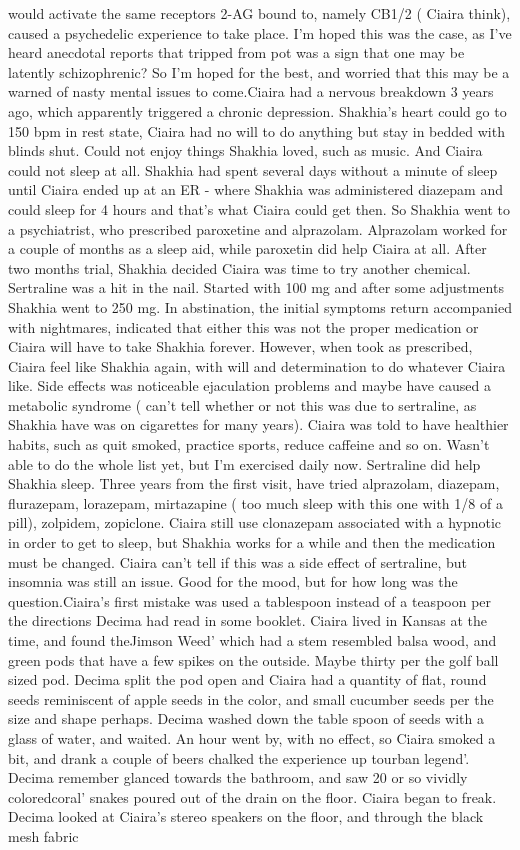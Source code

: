 \documentclass[12pt]{book}
\begin{document}
would activate the same receptors 2-AG bound to, namely CB1/2 ( Ciaira think), caused a psychedelic experience to take place. I'm hoped this was the case, as I've heard anecdotal reports that tripped from pot was a sign that one may be latently schizophrenic? So I'm hoped for the best, and worried that this may be a warned of nasty mental issues to come.Ciaira had a nervous breakdown 3 years ago, which apparently triggered a chronic depression. Shakhia's heart could go to 150 bpm in rest state, Ciaira had no will to do anything but stay in bedded with blinds shut. Could not enjoy things Shakhia loved, such as music. And Ciaira could not sleep at all. Shakhia had spent several days without a minute of sleep until Ciaira ended up at an ER - where Shakhia was administered diazepam and could sleep for 4 hours and that's what Ciaira could get then. So Shakhia went to a psychiatrist, who prescribed paroxetine and alprazolam. Alprazolam worked for a couple of months as a sleep aid, while paroxetin did help Ciaira at all. After two months trial, Shakhia decided Ciaira was time to try another chemical. Sertraline was a hit in the nail. Started with 100 mg and after some adjustments Shakhia went to 250 mg. In abstination, the initial symptoms return accompanied with nightmares, indicated that either this was not the proper medication or Ciaira will have to take Shakhia forever. However, when took as prescribed, Ciaira feel like Shakhia again, with will and determination to do whatever Ciaira like. Side effects was noticeable ejaculation problems and maybe have caused a metabolic syndrome ( can't tell whether or not this was due to sertraline, as Shakhia have was on cigarettes for many years). Ciaira was told to have healthier habits, such as quit smoked, practice sports, reduce caffeine and so on. Wasn't able to do the whole list yet, but I'm exercised daily now. Sertraline did help Shakhia sleep. Three years from the first visit, have tried alprazolam, diazepam, flurazepam, lorazepam, mirtazapine ( too much sleep with this one with 1/8 of a pill), zolpidem, zopiclone. Ciaira still use clonazepam associated with a hypnotic in order to get to sleep, but Shakhia works for a while and then the medication must be changed. Ciaira can't tell if this was a side effect of sertraline, but insomnia was still an issue. Good for the mood, but for how long was the question.Ciaira's first mistake was used a tablespoon instead of a teaspoon per the directions Decima had read in some booklet. Ciaira lived in Kansas at the time, and found theJimson Weed' which had a stem resembled balsa wood, and green pods that have a few spikes on the outside. Maybe thirty per the golf ball sized pod. Decima split the pod open and Ciaira had a quantity of flat, round seeds reminiscent of apple seeds in the color, and small cucumber seeds per the size and shape perhaps. Decima washed down the table spoon of seeds with a glass of water, and waited. An hour went by, with no effect, so Ciaira smoked a bit, and drank a couple of beers chalked the experience up tourban legend'. Decima remember glanced towards the bathroom, and saw 20 or so vividly coloredcoral' snakes poured out of the drain on the floor. Ciaira began to freak. Decima looked at Ciaira's stereo speakers on the floor, and through the black mesh fabric 
\end{document}
